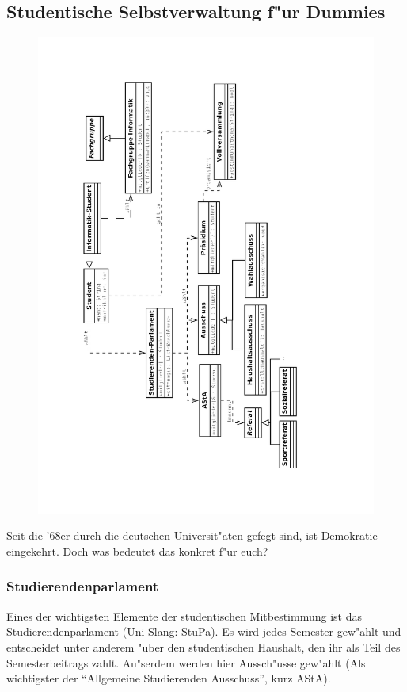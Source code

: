 \subsection{Studentische Selbstverwaltung f"ur Dummies}

\begin{figure}[b]
  \centering\includegraphics[width=\textwidth]{bilder/gremienkunde2.png}
\end{figure}

Seit die '68er durch die deutschen Universit"aten gefegt sind, ist Demokratie eingekehrt.
Doch was bedeutet das konkret f"ur euch?
\subsubsection*{Studierendenparlament}
Eines der wichtigsten Elemente der studentischen Mitbestimmung ist das Studierendenparlament (Uni-Slang: StuPa).
Es wird jedes Semester gew"ahlt und entscheidet unter anderem "uber den studentischen Haushalt, den ihr als Teil des Semesterbeitrags zahlt.
Au"serdem werden hier Aussch"usse gew"ahlt (Als wichtigster der "`Allgemeine Studierenden Ausschuss"', kurz AStA).
